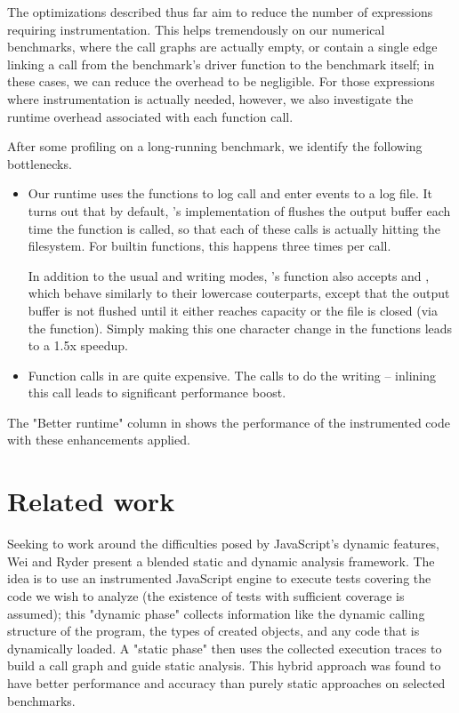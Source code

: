 The optimizations described thus far aim to reduce the number of expressions
requiring instrumentation. This helps tremendously on our numerical benchmarks,
where the call graphs are actually empty, or contain a single edge linking a
call from the benchmark's driver function to the benchmark itself; in these
cases, we can reduce the overhead to be negligible. For those expressions
where instrumentation is actually needed, however, we also investigate the
runtime overhead associated with each function call.

After some profiling on a long-running benchmark, we identify the following
bottlenecks.

\begin{itemize}

  \item Our runtime uses the  functions to log call and enter
    events to a log file. It turns out that by default, \matlab's
    implementation of  flushes the output buffer each time the
    function is called, so that each of these calls is actually hitting the
    filesystem. For builtin functions, this happens three times per call.

    In addition to the usual  and  writing modes,
    \matlab's  function also accepts  and ,
    which behave similarly to their lowercase couterparts, except that the
    output buffer is not flushed until it either reaches capacity or the file
    is closed (via the  function). Simply making this one
    character change in the  functions leads to
    a 1.5x speedup.

  \item Function calls in \matlab are quite expensive. The
     calls 
    to do the writing -- inlining this call leads to significant performance
    boost.

\end{itemize}

The "Better runtime" column in  shows the
performance of the instrumented code with these enhancements applied.

\section{Related work}

Seeking to work around the difficulties posed by JavaScript's dynamic features,
Wei and Ryder \cite{TaintAnalysisForJavaScript} present a blended static and
dynamic analysis framework. The idea is to use an instrumented JavaScript
engine to execute tests covering the code we wish to analyze (the existence of
tests with sufficient coverage is assumed); this "dynamic phase" collects
information like the dynamic calling structure of the program, the types of
created objects, and any code that is dynamically loaded. A "static phase" then
uses the collected execution traces to build a call graph and guide static
analysis. This hybrid approach was found to have better performance and
accuracy than purely static approaches on selected benchmarks.

